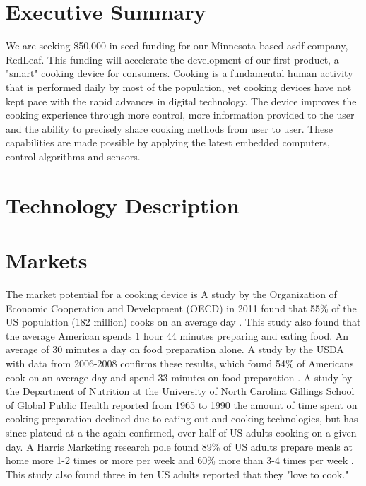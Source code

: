 \documentclass[11pt]{article}
\theoremstyle{definition}
\def\tenpt{\def\baselinestretch{0.88}\let\normalsize\normalsize\normalsize}
\begin{document}
\tenpt

\newcommand{\pxmark}{{\normalsize *}}
 \newcommand{\px}{\makebox[0pt][r]{\pxmark{\hspace*{.5pt}}}}

\pagestyle{plain}



\setlength{\itemsep}{-\parsep}\setlength{\topsep}{-\parsep}
\tenpt
\section{Executive Summary}\label{Overview}
\vspace{-0.15in} 

We are seeking \$50,000 in seed funding for our Minnesota based asdf company, RedLeaf. This funding will accelerate the development of our first product, a "smart" cooking device for consumers. Cooking is a fundamental human activity that is performed daily by most of the population, yet cooking devices have not kept pace with the rapid advances in digital technology. The device improves the cooking experience through more control, more information provided to the user and the ability to precisely share cooking methods from user to user. These capabilities are made possible by applying the latest  embedded computers, control algorithms and sensors. 

\section{Technology Description}






\section{Markets}

The market potential for a cooking device is A study by the Organization of Economic Cooperation and Development  (OECD) in 2011 found that 55\% of the US population (182 million) cooks on an average day \cite{cooktime}. This study also found that the average American spends 1 hour 44 minutes preparing and eating food. An average of 30 minutes a day on food preparation alone. A study by the USDA with data from 2006-2008 confirms these results, which found 54\% of Americans cook on an average day and spend 33 minutes on food preparation \cite{usdacooktime}. A study by the Department of Nutrition at the University of North Carolina Gillings School of Global Public Health reported from 1965 to 1990 the amount of time spent on cooking preparation declined due to eating out and cooking technologies, but has since plateud at a the again confirmed, over half of US adults cooking on a given day. A Harris Marketing research pole found 89\% of US adults prepare meals at home more 1-2 times or more per week and 60\% more than 3-4 times per week \cite{harris_food_stats}. This study also found three in ten US adults reported that they "love to cook."  
\end{document}
